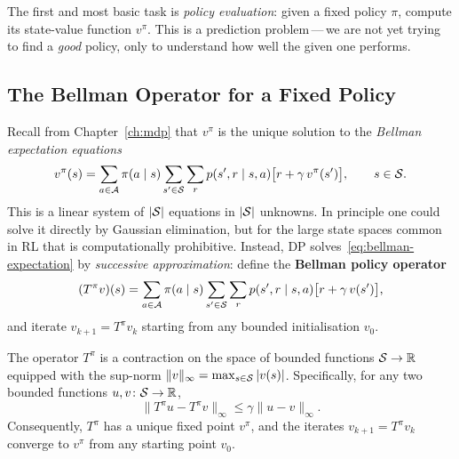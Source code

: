 The first and most basic task is \emph{policy evaluation}: given a fixed policy $\pi$, compute its state-value function $v^\pi$.  This is a prediction problem\,---\,we are not yet trying to find a \emph{good} policy, only to understand how well the given one performs.

\subsection*{The Bellman Operator for a Fixed Policy}

Recall from Chapter~\ref{ch:mdp} that $v^\pi$ is the unique solution to the \emph{Bellman expectation equations}
\begin{equation}
\label{eq:bellman-expectation}
v^\pi(s) = \sum_{a \in \mathcal{A}} \pi(a \mid s) \sum_{s' \in \mathcal{S}} \sum_{r} p(s', r \mid s, a)\bigl[r + \gamma\, v^\pi(s')\bigr], \qquad s \in \mathcal{S}.
\end{equation}
This is a linear system of $|\mathcal{S}|$ equations in $|\mathcal{S}|$ unknowns.  In principle one could solve it directly by Gaussian elimination, but for the large state spaces common in RL that is computationally prohibitive.  Instead, DP solves~\eqref{eq:bellman-expectation} by \emph{successive approximation}: define the \textbf{Bellman policy operator}
\begin{equation}
\label{eq:bellman-operator}
(T^\pi v)(s) = \sum_{a \in \mathcal{A}} \pi(a \mid s) \sum_{s' \in \mathcal{S}} \sum_{r} p(s', r \mid s, a)\bigl[r + \gamma\, v(s')\bigr],
\end{equation}
and iterate $v_{k+1} = T^\pi v_k$ starting from any bounded initialisation $v_0$.

\begin{theorem}[Contraction of $T^\pi$]
\label{thm:contraction-ch4}
The operator $T^\pi$ is a contraction on the space of bounded functions $\mathcal{S} \to \mathbb{R}$ equipped with the sup-norm $\|v\|_\infty = \max_{s \in \mathcal{S}}|v(s)|$.  Specifically, for any two bounded functions $u, v \colon \mathcal{S} \to \mathbb{R}$,
\[
\|T^\pi u - T^\pi v\|_\infty \le \gamma \|u - v\|_\infty.
\]
Consequently, $T^\pi$ has a unique fixed point $v^\pi$, and the iterates $v_{k+1} = T^\pi v_k$ converge to $v^\pi$ from any starting point $v_0$.
\end{theorem}

